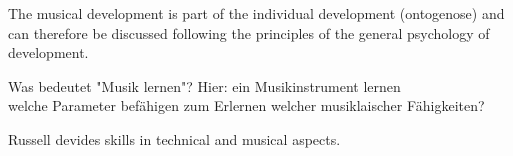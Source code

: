 The musical development is part of the individual development (ontogenose) \cite{Gembris1987} and can therefore be discussed following the principles of the general psychology of development.


Was bedeutet "Musik lernen"? Hier: ein Musikinstrument lernen\\

welche Parameter befähigen zum Erlernen welcher musiklaischer Fähigkeiten?

Russell \cite{Russell2010} devides skills in technical and musical aspects.  \\\\



%
%
%
%
%
